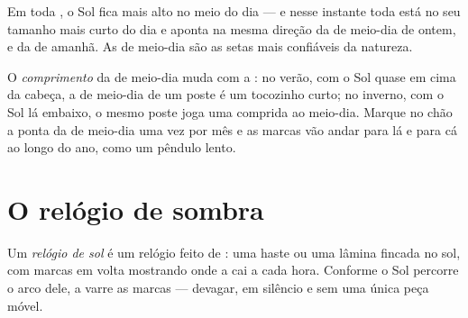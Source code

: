 \begin{proposition}\label{prop:g3:sun-days-seasons:midday}
Em toda , o Sol fica mais alto no meio do dia --- e nesse
instante toda  está no seu tamanho mais curto do dia e aponta
na mesma direção da  de meio-dia de ontem, e da de amanhã. As
 de meio-dia são as setas mais confiáveis da natureza.
\end{proposition}

\begin{example}\label{ex:g3:sun-days-seasons:shadowlength}
O \emph{comprimento} da  de meio-dia muda com a : no
verão, com o Sol quase em cima da cabeça, a  de meio-dia de um
poste é um tocozinho curto; no inverno, com o Sol lá embaixo, o mesmo
poste joga uma  comprida ao meio-dia. Marque no chão a ponta da
 de meio-dia uma vez por mês e as marcas vão andar para lá e
para cá ao longo do ano, como um pêndulo lento.
\end{example}

\section{O relógio de sombra}

\begin{definition}\label{def:g3:sun-days-seasons:sundial}
Um \emph{relógio de sol} é um relógio feito de
: uma haste ou uma lâmina fincada no sol, com marcas em volta
mostrando onde a  cai a cada hora. Conforme o Sol percorre o
arco dele, a  varre as marcas --- devagar, em silêncio e sem
uma única peça móvel.
\end{definition}

